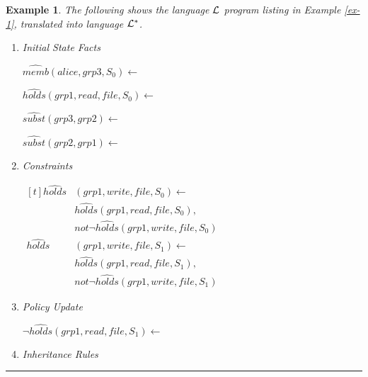\documentclass[10pt, twocolumn]{article}
\newtheorem{examp}{Example}
\newenvironment{example}{\begin{examp}\rm}{\rule{2mm}{2mm}\end{examp}}
\begin{document}
        \begin{example}
          \label{ex-2}
          The following shows the language ${\cal L}$ program listing in
          Example \ref{ex-1},  translated into language ${\cal L}^{*}$.

          \begin{enumerate}
            \item
              Initial State Facts

              $\hat{memb}(alice, grp3, S_{0}) \leftarrow$

              $\hat{holds}(grp1, read, file,S_{0}) \leftarrow$

              $\hat{subst}(grp3, grp2) \leftarrow$

              $\hat{subst}(grp2, grp1) \leftarrow$

            \item
              Constraints

              \begin{math}
                \begin{aligned}[t]
                  \hat{holds}&(grp1, write, file, S_{0}) \leftarrow \\
                  & \hat{holds}(grp1, read, file, S_{0}), \\
                  & not \lnot \hat{holds}(grp1, write, file, S_{0}) \\
                  \hat{holds}&(grp1, write, file, S_{1}) \leftarrow \\
                  & \hat{holds}(grp1, read, file, S_{1}), \\
                  & not \lnot \hat{holds}(grp1, write, file, S_{1})
                \end{aligned}
              \end{math}

            \item
              Policy Update

              \begin{math}
                \lnot \hat{holds}(grp1, read, file, S_{1}) \leftarrow
              \end{math}

            \item
              Inheritance Rules


\end{enumerate}
\end{example}
\end{document}
